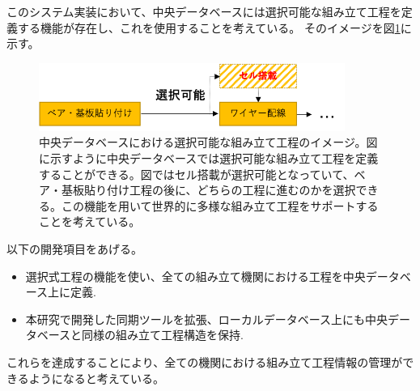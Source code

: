 このシステム実装において、中央データベースには選択可能な組み立て工程を定義する機能が存在し、これを使用することを考えている。
そのイメージを図\ref{optional_stage}に示す。

\begin{figure}[bpt]\centering
\includegraphics[width=10cm]{optional_stage}
\caption[中央データベースにおける選択可能な組み立て工程のイメージ]{中央データベースにおける選択可能な組み立て工程のイメージ。図に示すように中央データベースでは選択可能な組み立て工程を定義することができる。図ではセル搭載が選択可能となっていて、ベア・基板貼り付け工程の後に、どちらの工程に進むのかを選択できる。この機能を用いて世界的に多様な組み立て工程をサポートすることを考えている。}
\label{optional_stage}
\end{figure}

以下の開発項目をあげる。
\begin{itemize}
  \item 選択式工程の機能を使い、全ての組み立て機関における工程を中央データベース上に定義.
  \item 本研究で開発した同期ツールを拡張、ローカルデータベース上にも中央データベースと同様の組み立て工程構造を保持.
\end{itemize}

これらを達成することにより、全ての機関における組み立て工程情報の管理ができるようになると考えている。


